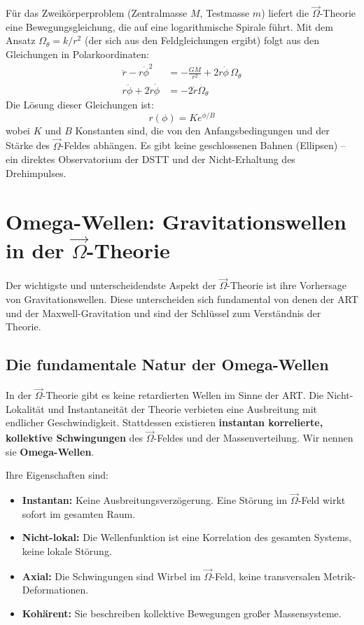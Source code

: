 \documentclass[12pt,a4paper]{article}
\begin{document}
Für das Zweikörperproblem (Zentralmasse $M$, Testmasse $m$) liefert die $\vec{\Omega}$-Theorie eine Bewegungsgleichung, die auf eine logarithmische Spirale führt. Mit dem Ansatz $\Omega_\theta = k/r^2$ (der sich aus den Feldgleichungen ergibt) folgt aus den Gleichungen in Polarkoordinaten:
\begin{align}
\ddot{r} - r\dot{\phi}^2 &= -\frac{GM}{r^2} + 2 r\dot{\phi} \, \Omega_\theta \\
r\ddot{\phi} + 2\dot{r}\dot{\phi} &= -2\dot{r} \Omega_\theta
\end{align}
Die Lösung dieser Gleichungen ist:
\begin{equation}
\boxed{ r(\phi) = K e^{\phi / B} }
\end{equation}
wobei $K$ und $B$ Konstanten sind, die von den Anfangsbedingungen und der Stärke des $\vec{\Omega}$-Feldes abhängen. Es gibt keine geschlossenen Bahnen (Ellipsen) – ein direktes Observatorium der DSTT und der Nicht-Erhaltung des Drehimpulses.

\section{Omega-Wellen: Gravitationswellen in der $\vec{\Omega}$-Theorie}

Der wichtigste und unterscheidendste Aspekt der $\vec{\Omega}$-Theorie ist ihre Vorhersage von Gravitationswellen. Diese unterscheiden sich fundamental von denen der ART und der Maxwell-Gravitation und sind der Schlüssel zum Verständnis der Theorie.

\subsection{Die fundamentale Natur der Omega-Wellen}

In der $\vec{\Omega}$-Theorie gibt es keine retardierten Wellen im Sinne der ART. Die Nicht-Lokalität und Instantaneität der Theorie verbieten eine Ausbreitung mit endlicher Geschwindigkeit. Stattdessen existieren \textbf{instantan korrelierte, kollektive Schwingungen} des $\vec{\Omega}$-Feldes und der Massenverteilung. Wir nennen sie \textbf{Omega-Wellen}.

Ihre Eigenschaften sind:
\begin{itemize}
    \item \textbf{Instantan:} Keine Ausbreitungsverzögerung. Eine Störung im $\vec{\Omega}$-Feld wirkt sofort im gesamten Raum.
    \item \textbf{Nicht-lokal:} Die Wellenfunktion ist eine Korrelation des gesamten Systems, keine lokale Störung.
    \item \textbf{Axial:} Die Schwingungen sind Wirbel im $\vec{\Omega}$-Feld, keine transversalen Metrik-Deformationen.
    \item \textbf{Kohärent:} Sie beschreiben kollektive Bewegungen großer Massensysteme.
\end{itemize}
\end{document}
